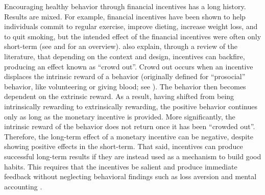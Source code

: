 \documentclass[12pt,letterpaperpaper,]{book}
\begin{document}
Encouraging healthy behavior through financial incentives has a long
history. Results are mixed. For example, financial incentives have been
shown to help individuals commit to regular exercise, improve dieting,
increase weight loss, and to quit smoking, but the intended effect of
the financial incentives were often only short-term (see
\citet{gneezy_when_2011} and \citet{cawley_economy_2015} for an
overview). \citet{gneezy_when_2011} also explain, through a review of
the literature, that depending on the context and design, incentives can
backfire, producing an effect known as ``crowd out''. Crowd out occurs
when an incentive displaces the intrinsic reward of a behavior
(originally defined for ``prosocial'' behavior, like volunteering or
giving blood; see \citet{benabou_incentives_2006}). The behavior then
becomes dependent on the extrinsic reward. As a result, having shifted
from being intrinsically rewarding to extrinsically rewarding, the
positive behavior continues only as long as the monetary incentive is
provided. More significantly, the intrinsic reward of the behavior does
not return once it has been ``crowded out''. Therefore, the long-term
effect of a monetary incentive can be negative, despite showing positive
effects in the short-term. That said, incentives can produce successful
long-term results if they are instead used as a mechanism to build good
habits. This requires that the incentives be salient and produce
immediate feedback without neglecting behavioral findings such as loss
aversion and mental accounting \citep{john_financial_2011}.
\end{document}
